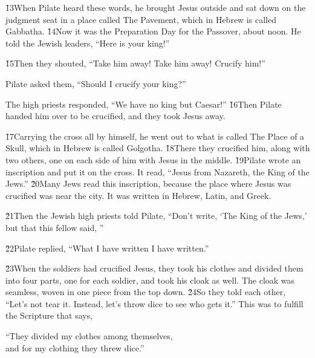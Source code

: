 \v{13}When Pilate heard these words, he brought Jesus outside and sat down on the judgment seat in a place called The Pavement, which in Hebrew is called Gabbatha. \v{14}Now it was the Preparation Day for the Passover, about noon. He told the Jewish leaders, ``Here is your king!''

\v{15}Then they shouted, ``Take him away! Take him away! Crucify him!''

Pilate asked them, ``Should I crucify your king?''

The high priests responded, ``We have no king but Caesar!'' \v{16}Then Pilate handed him over to be crucified, and they took Jesus away.

\v{17}Carrying the cross all by himself, he went out to what is called The Place of a Skull, which in Hebrew is called Golgotha. \v{18}There they crucified him, along with two others, one on each side of him with Jesus in the middle. \v{19}Pilate wrote an inscription and put it on the cross. It read, ``Jesus from Nazareth, the King of the Jews.'' \v{20}Many Jews read this inscription, because the place where Jesus was crucified was near the city. It was written in Hebrew, Latin, and Greek.

\v{21}Then the Jewish high priests told Pilate, ``Don't write, `The King of the Jews,' but that this fellow said, ''

\v{22}Pilate replied, ``What I have written I have written.''

\v{23}When the soldiers had crucified Jesus, they took his clothes and divided them into four parts, one for each soldier, and took his cloak as well. The cloak was seamless, woven in one piece from the top down. \v{24}So they told each other, ``Let's not tear it. Instead, let's throw dice to see who gets it.'' This was to fulfill the Scripture that says,

\begin{poetry}
\poeml ``They divided my clothes among themselves, \\
\poemll    and for my clothing they threw dice.''
\end{poetry}

